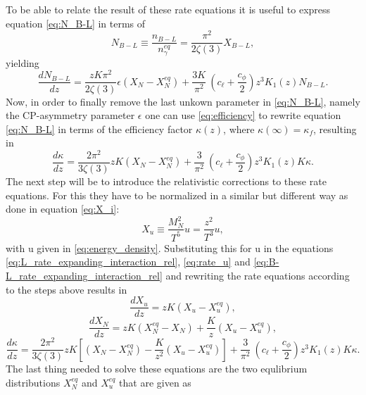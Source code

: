 To be able to relate the result of these rate equations it is useful to express equation \eqref{eq:N_B-L} in terms of
\begin{equation}
	N_{B-L}\equiv\frac{n_{B-L}}{n_\gamma^{eq}}=\frac{\pi^2}{2\zeta(3)}X_{B-L},
\end{equation}
yielding
\begin{equation}
\frac{dN_{B-L}}{dz}=\frac{zK\pi^2}{2\zeta(3)}\epsilon\left(X_N-X_N^{eq}\right)+\frac{3K}{\pi^2}\:\left(c_\ell+\frac{c_\phi}{2}\right)z^3K_1(z)N_{B-L}.
\label{eq:N_B-L}
\end{equation}
Now, in order to finally remove the last unkown parameter in \eqref{eq:N_B-L}, namely the CP-asymmetry parameter $\epsilon$ one can use \eqref{eq:efficiency} to rewrite equation \eqref{eq:N_B-L} in terms of the efficiency factor $\kappa(z)$, where $\kappa(\infty)=\kappa_f$, resulting in\begin{equation}
\frac{d\kappa}{dz}=\frac{2\pi^2}{3\zeta(3)}zK\left(X_N-X_N^{eq}\right)+\frac{3}{\pi^2}\:\left(c_\ell+\frac{c_\phi}{2}\right)z^3K_1(z)K\kappa.
\label{eq:kappa}
\end{equation}
The next step will be to introduce the relativistic corrections to these rate equations. For this they have to be normalized in a similar but different way as done in equation \eqref{eq:X_i}\cite[Eq. (7.9)]{Wormann:2016yyi}:
\begin{equation}
	X_u\equiv\frac{M_N^2}{T^5}u=\frac{z^2}{T^3}u,
	\label{eq:X_u}
\end{equation}
with u given in \eqref{eq:energy_density}.\newline \indent
Substituting this for u in the equations \eqref{eq:L_rate_expanding_interaction_rel}, \eqref{eq:rate_u} and \eqref{eq:B-L_rate_expanding_interaction_rel} and rewriting the rate equations according to the steps above results in\cite[p. 47]{Wormann:2016yyi}
\begin{equation}
\frac{dX_u}{dz}=zK\left(X_u-X_u^{eq}\right),
\end{equation}
\begin{equation}
\frac{dX_N}{dz}=zK\left(X_N^{eq}-X_N\right)+\frac{K}{z}\left(X_u-X_u^{eq}\right),
\end{equation}
\begin{equation}
\frac{d\kappa}{dz}=\frac{2\pi^2}{3\zeta(3)}zK\left[\left(X_N-X_N^{eq}\right)-\frac{K}{z^2}\left(X_u-X_u^{eq}\right)\right]+\frac{3}{\pi^2}\:\left(c_\ell+\frac{c_\phi}{2}\right)z^3K_1(z)K\kappa.
\end{equation}
The last thing needed to solve these equations are the two equlibrium distributions $X_N^{eq}$ and $X_u^{eq}$ that are given as
